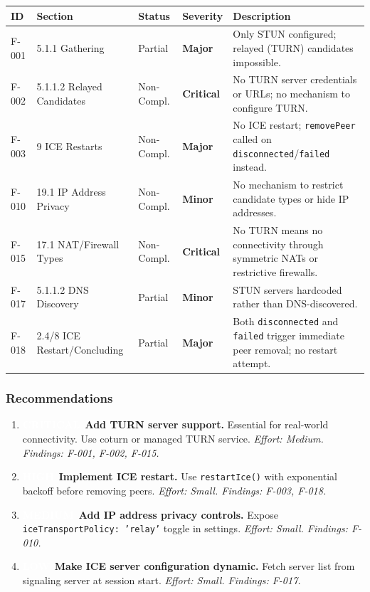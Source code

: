 \documentclass[11pt,letterpaper]{article}
\newcommand{\sevcritical}{\textcolor{critical}{\textbf{Critical}}}
\newcommand{\sevmajor}{\textcolor{major}{\textbf{Major}}}
\newcommand{\sevminor}{\textcolor{minor!80!black}{\textbf{Minor}}}
\newcommand{\pricritical}{\colorbox{critical}{\textcolor{white}{\small\textbf{CRITICAL}}}}
\newcommand{\prihigh}{\colorbox{major}{\textcolor{white}{\small\textbf{HIGH}}}}
\newcommand{\primedium}{\colorbox{minor!80!black}{\textcolor{white}{\small\textbf{MEDIUM}}}}
\newcommand{\prilow}{\colorbox{notapplicable}{\textcolor{white}{\small\textbf{LOW}}}}
\begin{document}
\begin{longtable}{C{1cm}L{2.8cm}C{1.5cm}C{1.2cm}L{6.7cm}}
\toprule
\textbf{ID} & \textbf{Section} & \textbf{Status} & \textbf{Severity} & \textbf{Description} \\
\midrule
\endhead
F-001 & 5.1.1 Gathering & Partial & \sevmajor & Only STUN configured; relayed (TURN) candidates impossible. \\
\midrule
F-002 & 5.1.1.2 Relayed Candidates & Non-Compl. & \sevcritical & No TURN server credentials or URLs; no mechanism to configure TURN. \\
\midrule
F-003 & 9 ICE Restarts & Non-Compl. & \sevmajor & No ICE restart; \texttt{removePeer} called on \texttt{disconnected}/\texttt{failed} instead. \\
\midrule
F-010 & 19.1 IP Address Privacy & Non-Compl. & \sevminor & No mechanism to restrict candidate types or hide IP addresses. \\
\midrule
F-015 & 17.1 NAT/Firewall Types & Non-Compl. & \sevcritical & No TURN means no connectivity through symmetric NATs or restrictive firewalls. \\
\midrule
F-017 & 5.1.1.2 DNS Discovery & Partial & \sevminor & STUN servers hardcoded rather than DNS-discovered. \\
\midrule
F-018 & 2.4/8 ICE Restart/Concluding & Partial & \sevmajor & Both \texttt{disconnected} and \texttt{failed} trigger immediate peer removal; no restart attempt. \\
\bottomrule
\end{longtable}

\subsubsection{Recommendations}

\begin{enumerate}[leftmargin=2em]
    \item \pricritical\ \textbf{Add TURN server support.} Essential for real-world connectivity. Use coturn or managed TURN service. \textit{Effort: Medium. Findings: F-001, F-002, F-015.}
    \item \prihigh\ \textbf{Implement ICE restart.} Use \texttt{restartIce()} with exponential backoff before removing peers. \textit{Effort: Small. Findings: F-003, F-018.}
    \item \primedium\ \textbf{Add IP address privacy controls.} Expose \texttt{iceTransportPolicy: 'relay'} toggle in settings. \textit{Effort: Small. Findings: F-010.}
    \item \prilow\ \textbf{Make ICE server configuration dynamic.} Fetch server list from signaling server at session start. \textit{Effort: Small. Findings: F-017.}
\end{enumerate}
\end{document}
